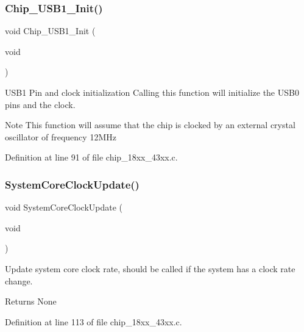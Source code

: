\subsubsection{\texorpdfstring{Chip\+\_\+\+U\+S\+B1\+\_\+\+Init()}{Chip\_USB1\_Init()}}
{\footnotesize\ttfamily void Chip\+\_\+\+U\+S\+B1\+\_\+\+Init (\begin{DoxyParamCaption}\item[{void}]{ }\end{DoxyParamCaption})}



U\+S\+B1 Pin and clock initialization Calling this function will initialize the U\+S\+B0 pins and the clock. 

\begin{DoxyNote}{Note}
This function will assume that the chip is clocked by an external crystal oscillator of frequency 12\+M\+Hz 
\end{DoxyNote}


Definition at line 91 of file chip\+\_\+18xx\+\_\+43xx.\+c.

\mbox{\label{group___s_u_p_p_o_r_t__18_x_x__43_x_x___f_u_n_c_gae0c36a9591fe6e9c45ecb21a794f0f0f}} 
\subsubsection{\texorpdfstring{System\+Core\+Clock\+Update()}{SystemCoreClockUpdate()}}
{\footnotesize\ttfamily void System\+Core\+Clock\+Update (\begin{DoxyParamCaption}\item[{void}]{ }\end{DoxyParamCaption})}



Update system core clock rate, should be called if the system has a clock rate change. 

\begin{DoxyReturn}{Returns}
None 
\end{DoxyReturn}


Definition at line 113 of file chip\+\_\+18xx\+\_\+43xx.\+c.



